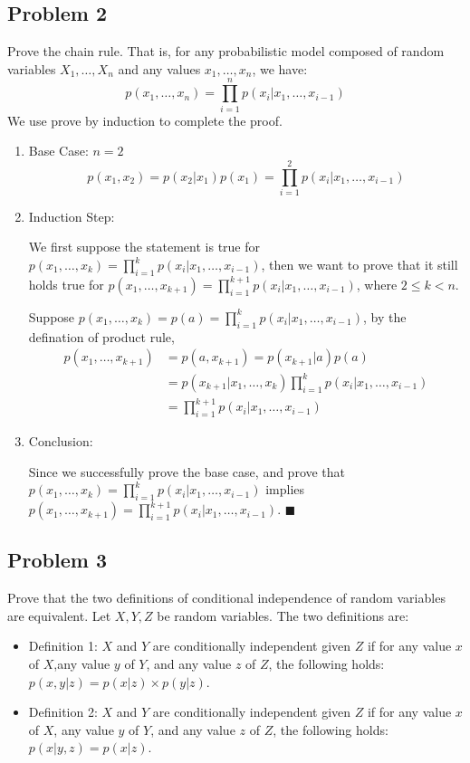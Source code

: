 \documentclass[]{article}
\begin{document}
\subsection*{Problem 2}
Prove the chain rule. That is, for any probabilistic model composed of random variables $X_1,\dots, X_n$ and any values $x_1,\dots, x_n$, we have:
$$p(x_1, \dots, x_n) = \prod_{i=1}^{n} p\left(x_i|x_1, \dots, x_{i-1}\right)$$
We use prove by induction to complete the proof.
\begin{enumerate}[1.]
\item Base Case: $n = 2$
$$p(x_1, x_2) = p(x_2|x_1)p(x_1) = \prod_{i = 1}^2 p\left(x_i|x_1, \dots, x_{i-1}\right)$$
\item Induction Step:
\par We first suppose the statement is true for $p(x_1, \dots, x_k) =\prod_{i=1}^{k} p\left(x_i|x_1, \dots, x_{i-1}\right) $, then we want to prove that it still holds true for $p(x_1, \dots, x_{k+1})=\prod_{i=1}^{k+1} p\left(x_i|x_1, \dots, x_{i-1}\right)$,  where $2\leq k< n$.
\par Suppose $p(x_1, \dots, x_k) = p(a) = \prod_{i=1}^{k} p\left(x_i|x_1, \dots, x_{i-1}\right)$, by the defination of product rule,
\begin{align*}
p(x_1, \dots, x_{k+1}) &= p(a, x_{k+1}) 
= p(x_{k+1}|a)p(a) \\
&= p(x_{k+1}|x_1,\dots, x_k)\prod_{i=1}^{k} p\left(x_i|x_1, \dots, x_{i-1}\right) \\
&= \prod_{i=1}^{k+1} p\left(x_i|x_1, \dots, x_{i-1}\right)
\end{align*}
\item Conclusion:
\par Since we successfully prove the base case, and prove that $p(x_1, \dots, x_k) =\prod_{i=1}^{k} p\left(x_i|x_1, \dots, x_{i-1}\right) $ implies $p(x_1, \dots, x_{k+1})=\prod_{i=1}^{k+1} p\left(x_i|x_1, \dots, x_{i-1}\right)$. \hfill $\blacksquare$
\end{enumerate}

\subsection*{Problem 3}
Prove that the two definitions of conditional independence of random variables are equivalent. Let $X, Y , Z$ be random variables. The two definitions are:
\begin{itemize}
\item Definition 1: $X$ and $Y$ are conditionally independent given $Z$ if for any value $x$ of $X$,any value $y$ of $Y$, and any value $z$ of $Z$, the following holds: $p(x,y|z) = p(x|z)\times p(y|z)$.
\item Definition 2: $X$ and $Y$ are conditionally independent given $Z$ if for any value $x$ of $X$, any value $y$ of $Y$, and any value $z$ of $Z$, the following holds: $p(x|y, z) = p(x|z)$.
\end{itemize}
\end{document}
